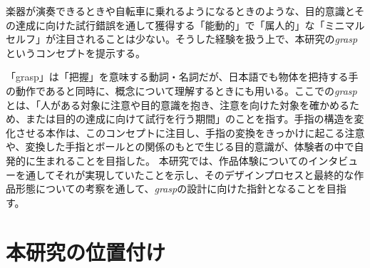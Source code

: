 楽器が演奏できるときや自転車に乗れるようになるときのような、目的意識とその達成に向けた試行錯誤を通して獲得する「能動的」で「属人的」な「ミニマルセルフ」が注目されることは少ない。そうした経験を扱う上で、本研究の\textit{grasp}というコンセプトを提示する。

「grasp」は「把握」を意味する動詞・名詞だが、日本語でも物体を把持する手の動作であると同時に、概念について理解するときにも用いる。ここでの\textit{grasp}とは、「人がある対象に注意や目的意識を抱き、注意を向けた対象を確かめるため、または目的の達成に向けて試行を行う期間」のことを指す。手指の構造を変化させる本作は、このコンセプトに注目し、手指の変換をきっかけに起こる注意や、変換した手指とボールとの関係のもとで生じる目的意識が、体験者の中で自発的に生まれることを目指した。
本研究では、作品体験についてのインタビューを通してそれが実現していたことを示し、そのデザインプロセスと最終的な作品形態についての考察を通して、\textit{grasp}の設計に向けた指針となることを目指す。

\section{本研究の位置付け}
